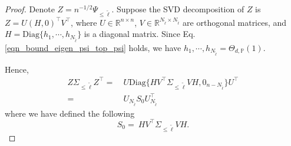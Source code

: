 \documentclass{article}
\theoremstyle{plain}
\theoremstyle{definition}
\theoremstyle{remark}
\newcommand{\reg}{\varphi_\lambda}
\begin{document}
\begin{appendix}
\begin{proof}
Denote $Z = n^{-1/2}\Psi_{\leq \tilde{\ell}}$. 
%
%
Suppose the SVD decomposition of $Z$ is $Z=U (H, 0)^{\top} V^{\top}$, where $U \in \mathbb{R}^{n \times n}$, $V \in \mathbb{R}^{N_{\tilde{\ell}} \times N_{\tilde{\ell}}}$ are orthogonal matrices, and $H = \text{Diag}\{h_1, \cdots, h_{N_{\tilde{\ell}}}\}$ 
is a diagonal matrix. 
Since Eq. \eqref{eqn_bound_eigen_psi_top_psi} holds, we have $h_1, \cdots, h_{N_{\tilde{\ell}}} = \Theta_{d, \mathbb{P}}(1)$.



Hence, 
\begin{equation}\label{eqn_finite_tau_bound}
\begin{aligned}
    Z \Sigma_{\leq \tilde{\ell}} Z^{\top} =&~
    U \text{Diag}\{ HV^{\top}\Sigma_{\leq \tilde{\ell}} VH, 0_{n-N_{\tilde{\ell}}} \} U^{\top}\\
    =&~
    U_{N_{\tilde{\ell}}} S_0 U_{N_{\tilde{\ell}}}^{\top}
\end{aligned}
\end{equation}
where we have defined the following 
$$
S_0 =~ HV^{\top}\Sigma_{\leq \tilde{\ell}} VH.
$$

\end{proof}
\end{appendix}
\end{document}
